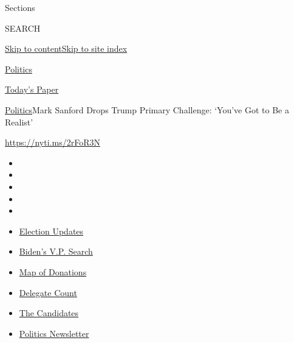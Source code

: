 Sections

SEARCH

\protect\hyperlink{site-content}{Skip to
content}\protect\hyperlink{site-index}{Skip to site index}

\href{https://www.nytimes.com/section/politics}{Politics}

\href{https://myaccount.nytimes.com/auth/login?response_type=cookie\&client_id=vi}{}

\href{https://www.nytimes.com/section/todayspaper}{Today's Paper}

\href{/section/politics}{Politics}\textbar{}Mark Sanford Drops Trump
Primary Challenge: `You've Got to Be a Realist'

\url{https://nyti.ms/2rFoR3N}

\begin{itemize}
\item
\item
\item
\item
\item
\end{itemize}

\begin{itemize}
\item
  \href{https://www.nytimes.com/2020/07/31/us/elections/biden-vs-trump.html?action=click\&pgtype=Article\&state=default\&region=TOP_BANNER\&context=storylines_menu}{Election
  Updates}
\item
  \href{https://www.nytimes.com/article/biden-vice-president-2020.html?action=click\&pgtype=Article\&state=default\&region=TOP_BANNER\&context=storylines_menu}{Biden's
  V.P. Search}
\item
  \href{https://www.nytimes.com/interactive/2020/07/24/us/politics/trump-biden-campaign-donors.html?action=click\&pgtype=Article\&state=default\&region=TOP_BANNER\&context=storylines_menu}{Map
  of Donations}
\item
  \href{https://www.nytimes.com/interactive/2020/us/elections/delegate-count-primary-results.html?action=click\&pgtype=Article\&state=default\&region=TOP_BANNER\&context=storylines_menu}{Delegate
  Count}
\item
  \href{https://www.nytimes.com/interactive/2019/us/politics/2020-presidential-candidates.html?action=click\&pgtype=Article\&state=default\&region=TOP_BANNER\&context=storylines_menu}{The
  Candidates}
\item
  \href{https://www.nytimes.com/newsletters/politics?action=click\&pgtype=Article\&state=default\&region=TOP_BANNER\&context=storylines_menu}{Politics
  Newsletter}
\end{itemize}

